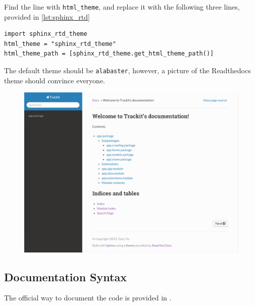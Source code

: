 \documentclass[../main/main.tex]{subfiles}
\begin{document}
Find the line with \lstinline|html_theme|, and replace it with the following
three lines, provided in \ref{lst:sphinx_rtd}

\begin{lstlisting}[caption=docs/conf.py,label=lst:sphinx_rtd]
import sphinx_rtd_theme
html_theme = "sphinx_rtd_theme"
html_theme_path = [sphinx_rtd_theme.get_html_theme_path()]
\end{lstlisting}

The default theme should be \lstinline|alabaster|, however, a picture of the
Readthedocs theme should convince everyone. 

\begin{figure}
\includegraphics[]{../figures/rtd_sphinx.png}
\end{figure}

\subsection{Documentation Syntax}

The official way to document the code is provided in \cite{sphinx:rest}.
\end{document}
